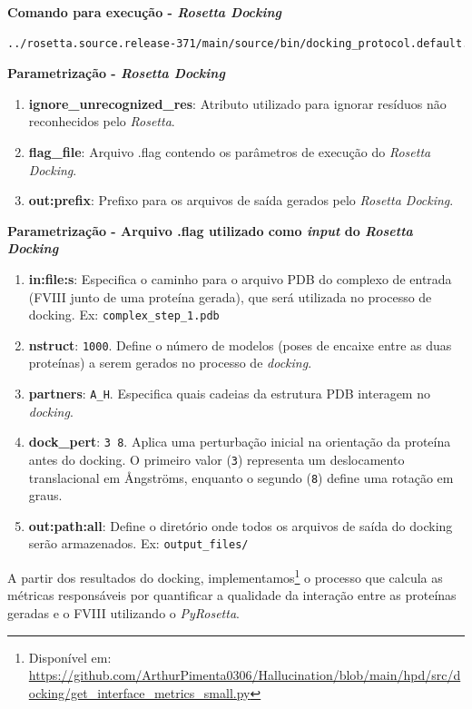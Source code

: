 \textbf{Comando para execução - \textit{Rosetta Docking}}
\begin{lstlisting}[language=bash, breaklines=true, frame=single, backgroundcolor=\color{lightgray}]
  ../rosetta.source.release-371/main/source/bin/docking_protocol.default.macosclangrelease -ignore_unrecognized_res @flag_file -out:prefix process_1_
\end{lstlisting}

\textbf{Parametrização - \textit{Rosetta Docking}}
\begin{enumerate}
    \item \textbf{ignore\_unrecognized\_res}: Atributo utilizado para ignorar resíduos não reconhecidos pelo \textit{Rosetta}.
    \item \textbf{flag\_file}: Arquivo .flag contendo os parâmetros de execução do \textit{Rosetta Docking}.
    \item \textbf{out:prefix}: Prefixo para os arquivos de saída gerados pelo \textit{Rosetta Docking}.
\end{enumerate}

\textbf{Parametrização - Arquivo .flag utilizado como \textit{input} do \textit{Rosetta Docking}}
\begin{enumerate}
    \item \textbf{in:file:s}: Especifica o caminho para o arquivo PDB do complexo de entrada (FVIII junto de uma proteína gerada), que será utilizada no processo de docking. Ex: \texttt{complex\_step\_1.pdb}
    \item \textbf{nstruct}: \texttt{1000}. Define o número de modelos (poses de encaixe entre as duas proteínas) a serem gerados no processo de \textit{docking}.
    \item \textbf{partners}: \texttt{A\_H}. Especifica quais cadeias da estrutura PDB interagem no \textit{docking}. 
    \item \textbf{dock\_pert}: \texttt{3 8}. Aplica uma perturbação inicial na orientação da proteína antes do docking. O primeiro valor (\texttt{3}) representa um deslocamento translacional em Ångströms, enquanto o segundo (\texttt{8}) define uma rotação em graus.
    \item \textbf{out:path:all}: Define o diretório onde todos os arquivos de saída do docking serão armazenados. Ex: \texttt{output\_files/} 
\end{enumerate}

A partir dos resultados do docking, implementamos\footnote{Disponível em: \url{https://github.com/ArthurPimenta0306/Hallucination/blob/main/hpd/src/docking/get_interface_metrics_small.py}}
o processo que calcula as métricas responsáveis por quantificar 
a qualidade da interação entre as proteínas geradas e o FVIII utilizando o \textit{PyRosetta}. 

